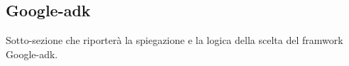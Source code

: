 \subsection{Google-adk}

Sotto-sezione che riporterà la spiegazione e la logica della scelta del framwork Google-adk.